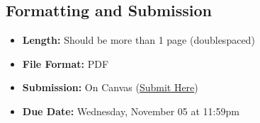 \documentclass[11pt]{article}
\begin{document}
\subsection*{Formatting and Submission}

\begin{itemize}
    \item[\faFileO] \textbf{Length:} Should be more than 1 page (doublespaced)
    \item[\faFileO] \textbf{File Format:} PDF
    \item[\faFileO] \textbf{Submission:} On Canvas (\href{https://canvas.uoregon.edu/courses/274682/assignments/1916913}{Submit Here})
    \item[\faFileO] \textbf{Due Date:} Wednesday, November 05 at 11:59pm
\end{itemize}
\end{document}
